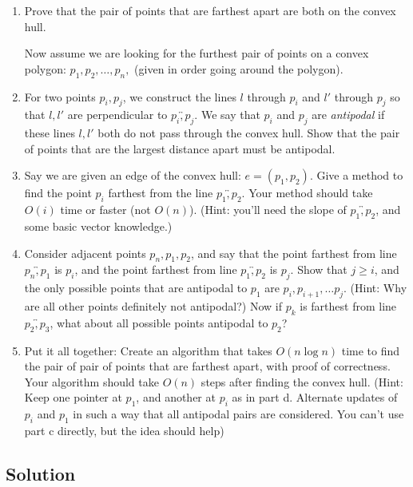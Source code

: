 \documentclass{article}
\begin{document}
{\begin{enumerate}
    \item Prove that the pair of points that are farthest apart are both on the convex hull.

    \vspace{3mm}
    Now assume we are looking for the furthest pair of points on a convex polygon:  $p_1,p_2,\ldots, p_n,$  (given in order going around the polygon).
    \item For two points $p_i,p_j$, we construct the lines $l$ through $p_i$ and $l'$ through $p_j$ so that $l,l'$ are perpendicular to $\overleftrightarrow{p_i,p_j}$. We say that $p_i$ and $p_j$ are \emph{antipodal} if these lines $l,l'$ both do not pass through the convex hull. Show that the pair of points that are the largest distance apart must be antipodal.
    \item Say we are given an edge of the convex hull: $e = (p_1, p_2)$. Give a method to find the point $p_i$ farthest from the line $\overleftrightarrow{p_1,p_2}$. Your method should take $O(i)$ time or faster (not $O(n)$).  (Hint: you'll need the slope of $\overleftrightarrow{p_1,p_2}$, and some basic vector knowledge.)
    \item  Consider adjacent points $p_n,p_1,p_2$, and say that the point farthest from line $\overleftrightarrow{p_n,p_1}$ is $p_i$, and the point farthest from line $\overleftrightarrow{p_1,p_2}$ is $p_j$. Show that $j \geq i$, and the only possible points that are antipodal to $p_1$ are $p_i, p_{i+1}, \ldots p_j$. (Hint: Why are all other points definitely not antipodal?) Now if $p_k$ is farthest from line $\overleftrightarrow{p_2,p_3}$, what about all possible points antipodal to $p_2$?
    \item  Put it all together: Create an algorithm that takes $O(n \log n)$ time to find the pair of pair of points that are farthest apart, with proof of correctness.  Your algorithm should take $O(n)$ steps after finding the convex hull. (Hint: Keep one pointer at $p_1$, and another at $p_i$ as in part d. Alternate updates of $p_i$ and $p_1$ in such a way that all antipodal pairs are considered.  You can't use part c directly, but the idea should help)
\end{enumerate}

\subsection*{Solution}

}
\end{document}
